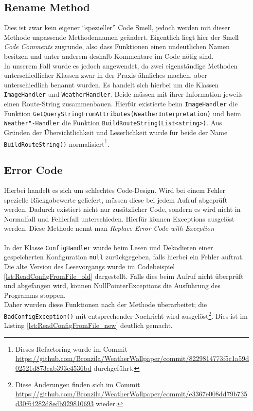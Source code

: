 \subsection{Rename Method}
Dies ist zwar kein eigener \enquote{spezieller} Code Smell, jedoch werden mit dieser Methode unpassende Methodennamen geändert.
Eigentlich liegt hier der Smell \textit{Code Comments} zugrunde, also dass Funktionen einen undeutlichen Namen besitzen und unter anderem deshalb Kommentare im Code nötig sind.\\

\noindent In unserem Fall wurde es jedoch angewendet, da zwei eigenständige Methoden unterschiedlicher Klassen zwar in der Praxis ähnliches machen, aber unterschiedlich benannt wurden.
Es handelt sich hierbei um die Klassen \texttt{ImageHandler} und \texttt{WeatherHandler}.
Beide müssen mit ihrer Information jeweils einen Route-String zusammenbauen.
Hierfür existierte beim \texttt{ImageHandler} die Funktion \texttt{GetQueryStringFromAttributes(WeatherInterpretation)} und beim \texttt{Weather"-Handler} die Funktion \texttt{BuildRouteString(List<string>)}.
Aus Gründen der Übersichtlichkeit und Leserlichkeit wurde für beide der Name \texttt{BuildRouteString()} normalisiert\footnote{Dieses Refactoring wurde im Commit \url{https://github.com/Bronzila/WeatherWallpaper/commit/8229814773f5c1a59d02521d873cab393e4536bd} durchgeführt.}.

\subsection{Error Code}
Hierbei handelt es sich um schlechtes Code-Design. 
Wird bei einem Fehler spezielle Rückgabewerte geliefert, müssen diese bei jedem Aufruf abgeprüft werden.
Dadurch existiert nicht nur zusätzlicher Code, sondern es wird nicht in Normalfall und Fehlerfall unterschieden.
Hierfür können Exceptions ausgelöst werden.
Diese Methode nennt man \textit{Replace Error Code with Exception}\\
\\
In der Klasse \texttt{ConfigHandler} wurde beim Lesen und Dekodieren einer gespeicherten Konfiguration \texttt{null} zurückgegeben, falls hierbei ein Fehler auftrat. 
Die alte Version des Lesevorgangs wurde im Codebeispiel \ref{lst:ReadConfigFromFile_old} dargestellt.
Falls dies beim Aufruf nicht überprüft und abgefangen wird, können NullPointerExceptions die Ausführung des Programms stoppen.\\
Daher wurden diese Funktionen nach der Methode überarbeitet; die \texttt{BadConfigException()} mit entsprechender Nachricht wird ausgelöst\footnote{Diese Änderungen finden sich im Commit \url{https://github.com/Bronzila/WeatherWallpaper/commit/e3367e008dd79b735d30f64282d8edb929810693} wieder.}.
Dies ist im Listing \ref{lst:ReadConfigFromFile_new} deutlich gemacht.

